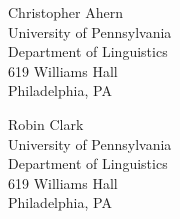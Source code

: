 \documentclass[linguex]{sp}
\theoremstyle{definition} \newtheorem{definition}{Definition}
\begin{document}
\begin{addresses}
  \begin{address}
    Christopher Ahern \\
    University of Pennsylvania\\
    Department of Linguistics\\
    619 Williams Hall \\
    Philadelphia, PA \\
  \end{address}
  \begin{address}
    Robin Clark \\
    University of Pennsylvania\\
    Department of Linguistics\\
    619 Williams Hall \\
    Philadelphia, PA\\
  \end{address}
\end{addresses}
\end{document}
